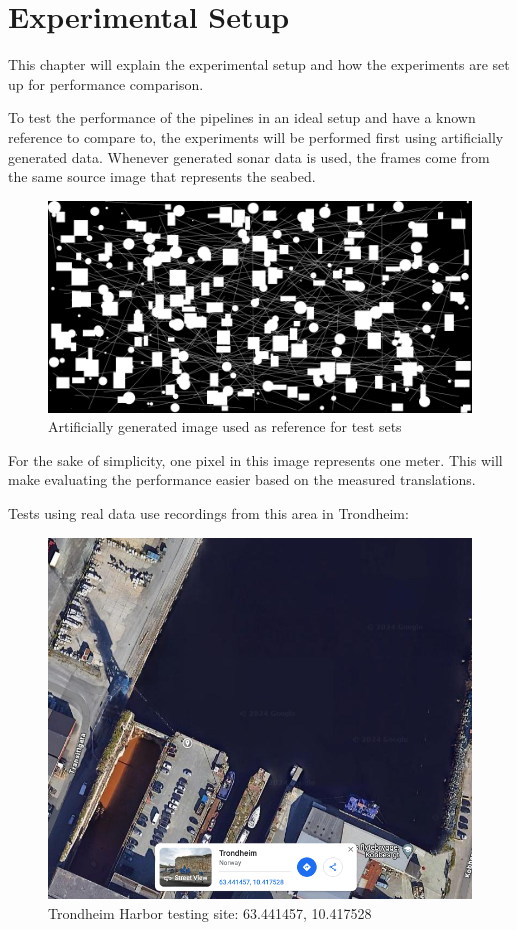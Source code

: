 \chapter{Experimental Setup}
\label{chap:setup}

This chapter will explain the experimental setup and how the experiments are set up for performance comparison.

To test the performance of the pipelines in an ideal setup and have a known reference to compare to, the experiments will be performed first using artificially generated data. Whenever generated sonar data is used, the frames come from the same source image that represents the seabed.

\begin{figure}[H]
  \centering
  \includegraphics[width=.7\textwidth]{figures/setup/test-reference.png}
  \caption[Source image for fake data]{Artificially generated image used as reference for test sets}
  \label{fig:test_reference}
\end{figure}

For the sake of simplicity, one pixel in this image represents one meter. This will make evaluating the performance easier based on the measured translations.

Tests using real data use recordings from this area in Trondheim:
\begin{figure}[H]
  \centering
  \includegraphics[width=.7\textwidth]{figures/setup/Map.png}
  \caption{Trondheim Harbor testing site: 63.441457, 10.417528}
  \label{fig:marina}
\end{figure}


